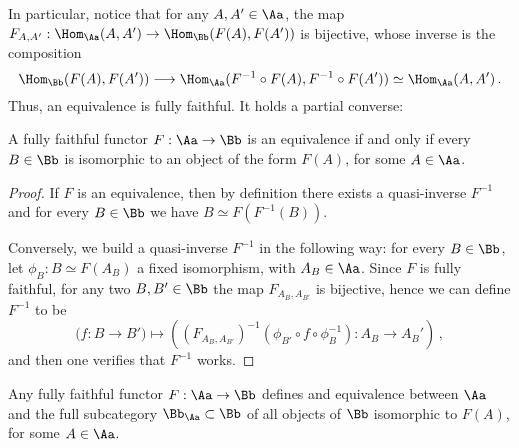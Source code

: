 In particular, notice that 
for any $A,A' \in \Aa$,
the map $F_{A,A'} : \Hom_{\Aa}(A, A') \to \Hom_{\Bb}(F(A),F(A'))$
is bijective, whose inverse is the composition
\begin{equation*}
    \Hom_{\Bb}(F(A),F(A')) \longrightarrow
    \Hom_{\Aa}(F^{-1} \circ F(A), F^{-1} \circ F(A')) \simeq
    \Hom_{\Aa}(A, A')\,.
\end{equation*}
Thus, an equivalence is fully faithful. It holds a partial converse:

\begin{prop}
    A fully faithful functor $F : \Aa \to \Bb$ is an equivalence
    if and only if every $B \in \Bb$ is isomorphic
    to an object of the form $F(A)$, for some $A \in \Aa$.
    \begin{proof}
        If $F$ is an equivalence, then by definition there exists
        a quasi-inverse $F^{-1}$ and for every $B \in \Bb$ we have
        $B \simeq F(F^{-1}(B))$.

        Conversely, we build a quasi-inverse $F^{-1}$ 
        in the following way: for every $B \in \Bb$,
        let $\phi_{B} : B \simeq F(A_{B})$ a fixed isomorphism,
        with $A_{B} \in \Aa$. Since $F$ is fully faithful,
        for any two $B, B' \in \Bb$ the map $F_{A_{B}, A_{B'}}$ 
        is bijective, hence we can define $F^{-1}$ to be
        \begin{equation*}
            \Big( f : B \to B' \Big)
            \longmapsto
            \left( \left(F_{A_{B},A_{B'}}\right)^{-1}(\phi_{B'} \circ f \circ \phi_{B}^{-1}) : A_B \to A_B' \right)\,,
        \end{equation*}
        and then one verifies that $F^{-1}$ works.
    \end{proof}
\end{prop}

\begin{cor}
    Any fully faithful functor $F:\Aa \to \Bb$
    defines and equivalence between $\Aa$ and
    the full subcategory $\Bb_{\Aa} \subset \Bb$
    of all objects of $\Bb$ isomorphic to $F(A)$,
    for some $A \in \Aa$.
\end{cor}

